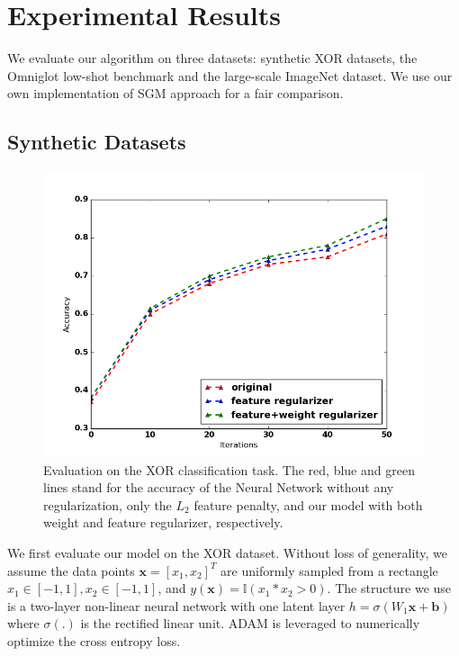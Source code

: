 \section{Experimental Results}
\label{sec:exp}
{\color{red}We evaluate our algorithm on three datasets: synthetic XOR datasets, the Omniglot low-shot benchmark and the large-scale ImageNet dataset. We use our own implementation of SGM approach \cite{low-shot} for a fair comparison.}

\subsection{Synthetic Datasets}
\begin{figure}
	\begin{center}
	\includegraphics[width=0.5\columnwidth]{xor-plot.png}
	\end{center}
	\caption{Evaluation on the XOR classification task. The red, blue and green lines stand for the accuracy of the Neural Network without any regularization, only the $L_2$ feature penalty, and our model with both weight and feature regularizer, respectively.}
	\label{fig-xor-plot}
\end{figure}
We first evaluate our model on the XOR dataset. Without loss of generality, we assume the data points $\mathbf{x}=[x_1,x_2]^T$ are uniformly sampled from a rectangle $x_1\in [-1,1],x_2\in [-1,1]$, and $y(\mathbf{x})=\mathbb{I}(x_1*x_2>0)$. The structure we use is a two-layer non-linear neural network with one latent layer $h=\sigma(W_1\mathbf{x}+\mathbf{b})$ where $\sigma(.)$ is the rectified linear unit. ADAM \cite{adam} is leveraged to numerically optimize the cross entropy loss.

